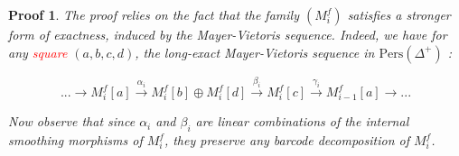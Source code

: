 \documentclass[a4paper, english, 11pt]{article}
\newcommand{\Pe}{\text{Pers}}
\newcommand{\0}{\vec{0}}
\newtheorem*{pf}{Proof} }
\begin{document}
\begin{pf}
The proof relies on the fact that the family $(M_i^f)$ satisfies a stronger form of exactness, induced by the Mayer-Vietoris sequence. Indeed, we have for any \textcolor{red}{square} $(a,b,c,d)$, the long-exact Mayer-Vietoris sequence in $\Pe(\Delta^+)$ : 

$$...\stackrel{}{\longrightarrow} M_i^f[a] \stackrel{\alpha_i}{\longrightarrow} M_i^f[b] \oplus M_i^f[d] \stackrel{\beta_i}{\longrightarrow} M_i^f[c] \stackrel{\gamma_i}{\longrightarrow} M_{i-1}^f[a] \longrightarrow ...  $$

Now observe that since $\alpha_i$  and $\beta_i$ are linear combinations of the internal smoothing morphisms of $M_i^f$, they preserve any barcode decomposition of $M_i^f$.
\end{pf}



\end{document}
